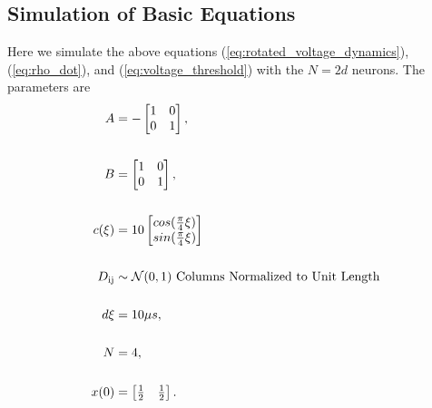 \subsection{Simulation of Basic Equations}
Here we simulate the above equations (\ref{eq:rotated_voltage_dynamics}), (\ref{eq:rho_dot}), and (\ref{eq:voltage_threshold}) with the $N = 2d$ neurons. The parameters are
\begin{align}
\label{eq:sim_I_params}
A &= -\begin{bmatrix}  
1 & 0 \\
0 & 1
\end{bmatrix},\notag \\
\notag \\
B &= \begin{bmatrix}  
1 & 0 \\
0 & 1
\end{bmatrix}, \notag \\
\notag \\
c(\xi) &= 10 \begin{bmatrix} 
cos(\frac{\pi}{4} \xi)\\
sin(\frac{\pi}{4} \xi)
\end{bmatrix} \\
\notag \\
D_{\text{ij}} &\sim  \mathcal{N} (0, 1) \text{ Columns Normalized to Unit Length} \notag \\
\notag \\
d\xi &= 10 \mu s,\notag \\
\notag \\
N &= 4,\notag \\
\notag \\
x(0) &= \begin{bmatrix} \frac{1}{2} & \frac{1}{2} \end{bmatrix}.\notag 
\end{align}

